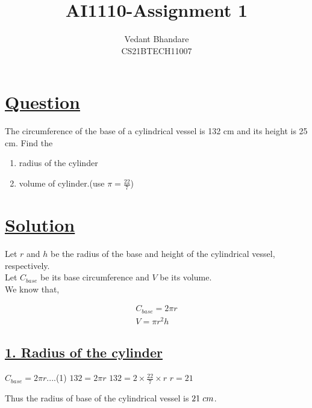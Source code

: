 \documentclass[journal,12pt,twocolumn]{IEEEtran}
\begin{document}
\raggedbottom
\setlength{\parindent}{0pt}
\vspace{3cm}
\title{AI1110-Assignment 1}
\author{Vedant Bhandare\\CS21BTECH11007}
\maketitle
\newpage
\bigskip
\renewcommand{\thefigure}{\theenumi}
\renewcommand{\thetable}{\theenumi}

\section*{\underline{\textbf{Question}}}
The circumference of the base of a cylindrical vessel is 132 cm and its height is 25 cm. Find the

\begin{enumerate}
    \item radius of the cylinder
    \item volume of cylinder.(use $\pi = \frac{22}{7}$)
\end{enumerate}
\section*{\underline{\textbf{Solution}}}
Let $r$ and $h$ be the radius of the base and height of the cylindrical vessel, respectively.\\
Let $C_{base}$ be its base circumference and $V$ be its volume.\\

We know that,

\begin{align}
    C_{base} = 2\pi{r}\\
    V = \pi{r^2h}
\end{align}

\subsection*{\underline{\textbf{1. Radius of the cylinder}}}
\vspace{2mm}
\large{$C_{base} = 2\pi{r}$\hspace{5.25cm}....(1)}
\newline
$132 = 2\pi{r}$
\newline
$132 = 2\times\frac{22}{7}\times{r}$
\newline
$r = 21$
\begin{center}
    Thus the radius of base of the cylindrical vessel is $21 \hspace{1mm}cm$.
\end{center}
\newline
\end{document}
